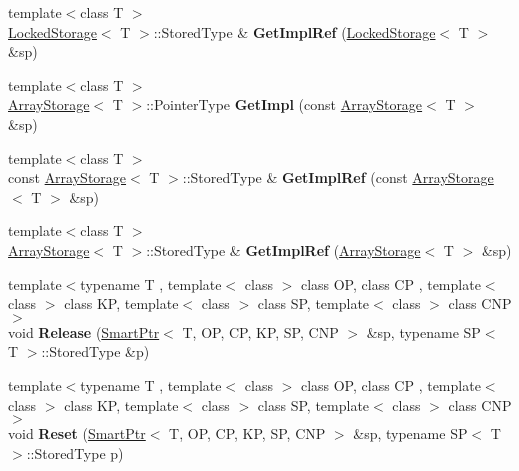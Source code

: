 \begin{DoxyCompactItemize}
\item 
\hypertarget{namespaceLoki_a3be63064c5c8813f445e9acfd12fe41d}{}{\footnotesize template$<$class T $>$ }\\\hyperlink{classLoki_1_1LockedStorage}{Locked\+Storage}$<$ T $>$\+::Stored\+Type \& {\bfseries Get\+Impl\+Ref} (\hyperlink{classLoki_1_1LockedStorage}{Locked\+Storage}$<$ T $>$ \&sp)\label{namespaceLoki_a3be63064c5c8813f445e9acfd12fe41d}

\item 
\hypertarget{namespaceLoki_a432339ef25eda3ad8526d88a9f473559}{}{\footnotesize template$<$class T $>$ }\\\hyperlink{classLoki_1_1ArrayStorage}{Array\+Storage}$<$ T $>$\+::Pointer\+Type {\bfseries Get\+Impl} (const \hyperlink{classLoki_1_1ArrayStorage}{Array\+Storage}$<$ T $>$ \&sp)\label{namespaceLoki_a432339ef25eda3ad8526d88a9f473559}

\item 
\hypertarget{namespaceLoki_a4821d0ccdccd94fb729045ef01bd1ba2}{}{\footnotesize template$<$class T $>$ }\\const \hyperlink{classLoki_1_1ArrayStorage}{Array\+Storage}$<$ T $>$\+::Stored\+Type \& {\bfseries Get\+Impl\+Ref} (const \hyperlink{classLoki_1_1ArrayStorage}{Array\+Storage}$<$ T $>$ \&sp)\label{namespaceLoki_a4821d0ccdccd94fb729045ef01bd1ba2}

\item 
\hypertarget{namespaceLoki_a422d30fea24e424f63b883d184d8c078}{}{\footnotesize template$<$class T $>$ }\\\hyperlink{classLoki_1_1ArrayStorage}{Array\+Storage}$<$ T $>$\+::Stored\+Type \& {\bfseries Get\+Impl\+Ref} (\hyperlink{classLoki_1_1ArrayStorage}{Array\+Storage}$<$ T $>$ \&sp)\label{namespaceLoki_a422d30fea24e424f63b883d184d8c078}

\item 
\hypertarget{namespaceLoki_ad7a2991d1f7abf21a5de091ca146e572}{}{\footnotesize template$<$typename T , template$<$ class $>$ class O\+P, class C\+P , template$<$ class $>$ class K\+P, template$<$ class $>$ class S\+P, template$<$ class $>$ class C\+N\+P$>$ }\\void {\bfseries Release} (\hyperlink{classLoki_1_1SmartPtr}{Smart\+Ptr}$<$ T, O\+P, C\+P, K\+P, S\+P, C\+N\+P $>$ \&sp, typename S\+P$<$ T $>$\+::Stored\+Type \&p)\label{namespaceLoki_ad7a2991d1f7abf21a5de091ca146e572}

\item 
\hypertarget{namespaceLoki_a958fa86d4fe0aa9f263aba22e6680258}{}{\footnotesize template$<$typename T , template$<$ class $>$ class O\+P, class C\+P , template$<$ class $>$ class K\+P, template$<$ class $>$ class S\+P, template$<$ class $>$ class C\+N\+P$>$ }\\void {\bfseries Reset} (\hyperlink{classLoki_1_1SmartPtr}{Smart\+Ptr}$<$ T, O\+P, C\+P, K\+P, S\+P, C\+N\+P $>$ \&sp, typename S\+P$<$ T $>$\+::Stored\+Type p)\label{namespaceLoki_a958fa86d4fe0aa9f263aba22e6680258}


\end{DoxyCompactItemize}
